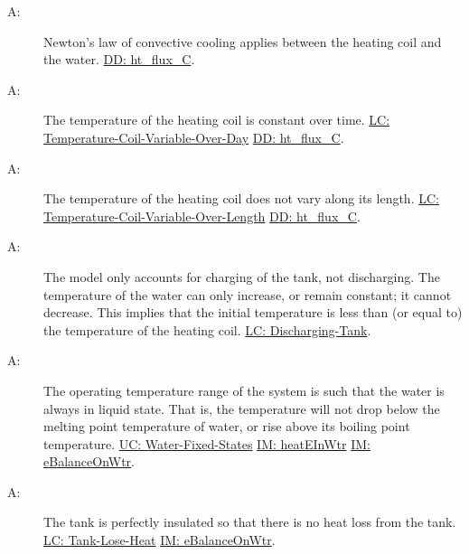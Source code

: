 \documentclass[12pt]{article}
\newcounter{assumpnum}
\newcommand{\atheassumpnum}{A\theassumpnum}
\begin{document}
\begin{description}
\item[\atheassumpnum\label{A:Newton-Law-Convective-Cooling-Coil-Water}:]Newton's law of convective cooling applies between the heating coil and the water. \hyperref[DD:ht.flux.C]{DD: ht\_flux\_C}.
\end{description}
\begin{description}
\item[\atheassumpnum\label{A:Temp-Heating-Coil-Constant-over-Time}:]The temperature of the heating coil is constant over time. \hyperref[likeChgTCVOD]{LC: Temperature-Coil-Variable-Over-Day} \hyperref[DD:ht.flux.C]{DD: ht\_flux\_C}.
\end{description}
\begin{description}
\item[\atheassumpnum\label{A:Temp-Heating-Coil-Constant-over-Length}:]The temperature of the heating coil does not vary along its length. \hyperref[likeChgTCVOL]{LC: Temperature-Coil-Variable-Over-Length} \hyperref[DD:ht.flux.C]{DD: ht\_flux\_C}.
\end{description}
\begin{description}
\item[\atheassumpnum\label{A:Charging-Tank-No-Temp-Discharge}:]The model only accounts for charging of the tank, not discharging. The temperature of the water can only increase, or remain constant; it cannot decrease. This implies that the initial temperature is less than (or equal to) the temperature of the heating coil. \hyperref[likeChgDT]{LC: Discharging-Tank}.
\end{description}
\begin{description}
\item[\atheassumpnum\label{A:Water-Always-Liquid}:]The operating temperature range of the system is such that the water is always in liquid state. That is, the temperature will not drop below the melting point temperature of water, or rise above its boiling point temperature. \hyperref[unlikeChgWFS]{UC: Water-Fixed-States} \hyperref[IM:heatEInWtr]{IM: heatEInWtr} \hyperref[IM:eBalanceOnWtr]{IM: eBalanceOnWtr}.
\end{description}
\begin{description}
\item[\atheassumpnum\label{A:Perfect-Insulation-Tank}:]The tank is perfectly insulated so that there is no heat loss from the tank. \hyperref[likeChgTLH]{LC: Tank-Lose-Heat} \hyperref[IM:eBalanceOnWtr]{IM: eBalanceOnWtr}.
\end{description}
\end{document}

